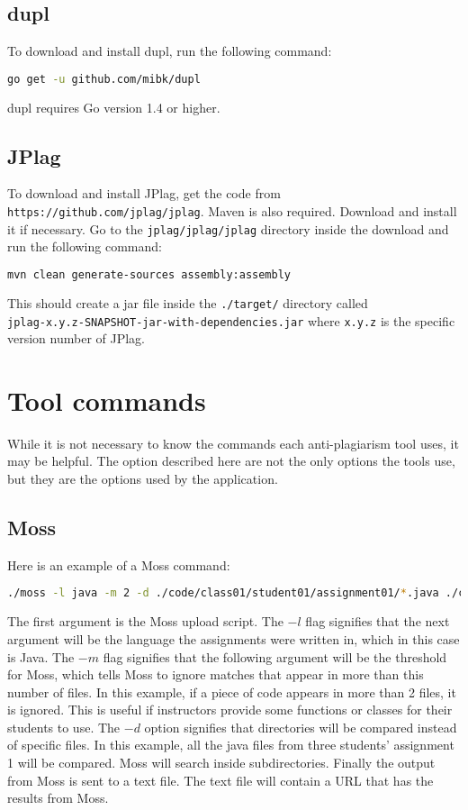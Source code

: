 \documentclass[12pt]{article}
\begin{document}
		\subsection{dupl}
			To download and install dupl, run the following command:
			\begin{lstlisting}[language=bash]
	go get -u github.com/mibk/dupl
			\end{lstlisting}
			\noindent dupl requires Go version 1.4 or higher.
			
		\subsection{JPlag}
			To download and install JPlag, get the code from \\\verb|https://github.com/jplag/jplag|. Maven is also required. Download and install it if necessary. Go to the \verb|jplag/jplag/jplag| directory inside the download and run the following command:
			\begin{lstlisting}[language=bash]
	mvn clean generate-sources assembly:assembly
			\end{lstlisting}
			This should create a jar file inside the \verb|./target/| directory called \\\verb|jplag-x.y.z-SNAPSHOT-jar-with-dependencies.jar| where \verb|x.y.z| is the specific version number of JPlag.
			
	\section{Tool commands}
		While it is not necessary to know the commands each anti-plagiarism tool uses, it may be helpful. The option described here are not the only options the tools use, but they are the options used by the application.
		
		\subsection{Moss}
			Here is an example of a Moss command:
			\begin{lstlisting}[language=bash, breaklines=true]
./moss -l java -m 2 -d ./code/class01/student01/assignment01/*.java ./code/class01/student02/assignment01/*.java ./code/class01/student03/assignment01/*.java > assignment01.txt &
			\end{lstlisting}
			\noindent The first argument is the Moss upload script. The $-l$ flag signifies that the next argument will be the language the assignments were written in, which in this case is Java. The $-m$ flag signifies that the following argument will be the threshold for Moss, which tells Moss to ignore matches that appear in more than this number of files. In this example, if a piece of code appears in more than 2 files, it is ignored. This is useful if instructors provide some functions or classes for their students to use. The $-d$ option signifies that directories will be compared instead of specific files. In this example, all the java files from three students' assignment 1 will be compared. Moss will search inside subdirectories. Finally the output from Moss is sent to a text file. The text file will contain a URL that has the results from Moss.
			
\end{document}
